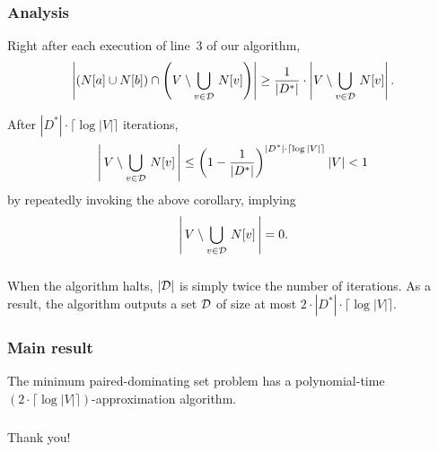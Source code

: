\documentclass{beamer}
\begin{document}
\setcounter{footnote}{0}
\begin{frame}\frametitle{Analysis}
\begin{corollary}
Right after each execution of line~3 of our algorithm,
\label{thekeycorollary}
$$
\left|\left(N[a]\cup N[b]\right)\cap \left(V\setminus \bigcup_{v\in {\cal D}}\,N[v]\right)\right|
\ge \frac{1}{|D^*|}
\cdot\left|V\setminus \bigcup_{v\in {\cal D}}\,N[v]\right|.
$$
\end{corollary}
After $|D^*|\cdot\lceil\log|V|\rceil$ iterations,
$$
\left|\,
V\setminus \bigcup_{v\in {\cal D}}\,N[v]
\,\right|
\leq\left(1-\frac{1}{|D^*|}\right)^{|D^*|\cdot\lceil\log|V|\rceil}
|V|<1
$$
by repeatedly invoking the above
corollary,
implying
$$
\left|\, V\setminus \bigcup_{v\in {\cal D}}\,N[v] \,\right|=0.
$$
\end{frame}
\setcounter{footnote}{0}
\begin{frame}\frametitle{}
\begin{center}
When the algorithm halts,
$|{\cal D}|$ is simply twice the number of iterations.
As a result, the algorithm outputs
a set ${\cal D}$ of
size at most $2\cdot|D^*|\cdot\lceil\log|V|\rceil$.
	

\end{center}
\end{frame}

\setcounter{footnote}{0}
\begin{frame}\frametitle{Main result}
\begin{theorem}
The minimum paired-dominating set problem
has a polynomial-time
$(2\cdot\lceil\log|V|\rceil)$-approximation algorithm.
\end{theorem}
\end{frame}


\setcounter{footnote}{0}
\begin{frame}\frametitle{}
\begin{center}
{\large Thank you!}
\end{center}
\end{frame}


%
%
\end{document}
